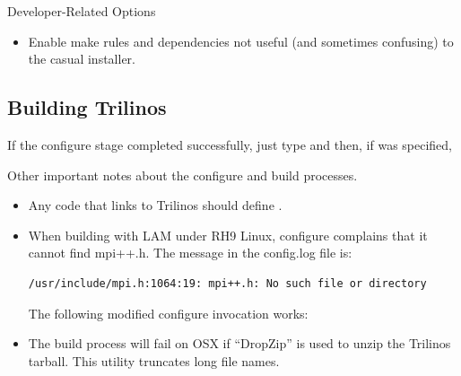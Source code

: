 Developer-Related Options
\begin{itemize}
\item {}

Enable make rules and dependencies not useful (and sometimes confusing) to 
the casual installer.
\end{itemize}

\subsection{Building Trilinos}

If the configure stage completed successfully, just type 
 and then, if 
 was specified, 

Other important notes about the configure and build processes.
\begin{itemize}
\item Any code that links to Trilinos should define 
.

\item When building with LAM under RH9 Linux, configure complains that it 
cannot find mpi++.h.  The message in the config.log file is:
\begin{verbatim}
/usr/include/mpi.h:1064:19: mpi++.h: No such file or directory
\end{verbatim}
The following modified configure invocation works:

\item The build process will fail on OSX if ``DropZip'' is used to 
unzip the Trilinos tarball.  This utility truncates long file names.

\end{itemize}

